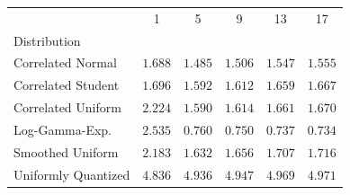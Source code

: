 \begin{tabular}{lccccc}
\toprule
 & 1 & 5 & 9 & 13 & 17 \\
Distribution &  &  &  &  &  \\
\midrule
Correlated Normal & $ 1.688 $ & $ 1.485 $ & $ 1.506 $ & $ 1.547 $ & $ 1.555 $ \\
Correlated Student & $ 1.696 $ & $ 1.592 $ & $ 1.612 $ & $ 1.659 $ & $ 1.667 $ \\
Correlated Uniform & $ 2.224 $ & $ 1.590 $ & $ 1.614 $ & $ 1.661 $ & $ 1.670 $ \\
Log-Gamma-Exp. & $ 2.535 $ & $ 0.760 $ & $ 0.750 $ & $ 0.737 $ & $ 0.734 $ \\
Smoothed Uniform & $ 2.183 $ & $ 1.632 $ & $ 1.656 $ & $ 1.707 $ & $ 1.716 $ \\
Uniformly Quantized & $ 4.836 $ & $ 4.936 $ & $ 4.947 $ & $ 4.969 $ & $ 4.971 $ \\
\bottomrule
\end{tabular}

